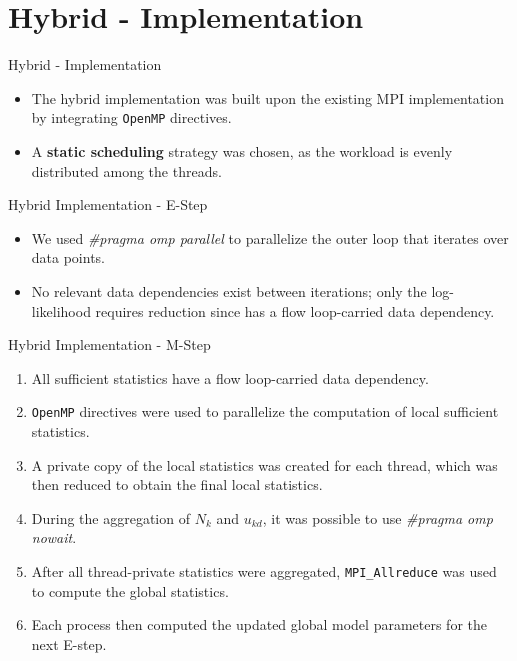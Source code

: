 \section{Hybrid - Implementation}
    \begin{frame}{Hybrid - Implementation}
        \centering
        \begin{itemize}
            \item The hybrid implementation was built upon the existing MPI implementation by integrating \texttt{OpenMP} directives.
            \item A \textbf{static scheduling} strategy was chosen, as the workload is evenly distributed among the threads.
        \end{itemize}
    \end{frame}
    \begin{frame}{Hybrid Implementation - E-Step}
        \centering
        \begin{itemize}
            \item We used \emph{\#pragma omp parallel} to parallelize the outer loop that iterates over data points.
            \item No relevant data dependencies exist between iterations; only the log-likelihood requires reduction since has a flow loop-carried data dependency.
        \end{itemize}
    \end{frame}
    \begin{frame}{Hybrid Implementation - M-Step}
        \centering
        \begin{enumerate}
            \item All sufficient statistics have a flow loop-carried data dependency.
            \item \texttt{OpenMP} directives were used to parallelize the computation of local sufficient statistics.
            \item A private copy of the local statistics was created for each thread, which was then reduced to obtain the final local statistics.
            \item During the aggregation of $N_k$ and $u_{kd}$, it was possible to use \emph{\#pragma omp nowait}.
            \item After all thread-private statistics were aggregated, \texttt{MPI\_Allreduce} was used to compute the global statistics.
            \item Each process then computed the updated global model parameters for the next E-step.
        \end{enumerate}
    \end{frame}